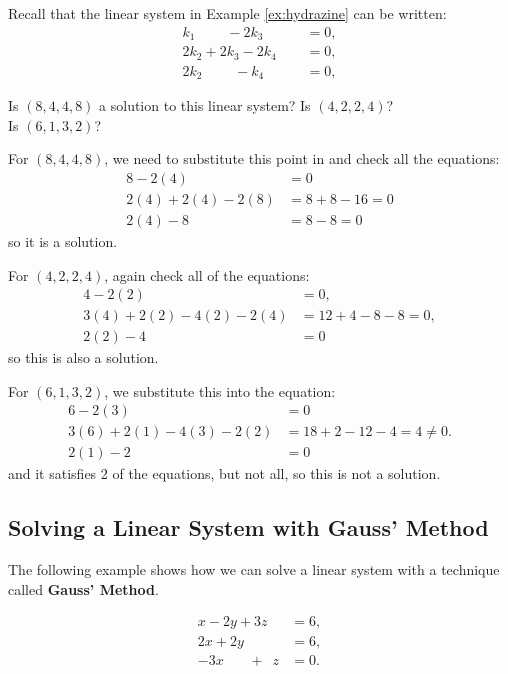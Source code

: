 \begin{example}
Recall that the linear system in Example \ref{ex:hydrazine} can be written:
\begin{align*}
k_1 \phantom{+2k_2}- 2k_3\phantom{+2k_4} & = 0, \\
2k_2 + 2k_3 -2k_4 & = 0, \\
2k_2 \phantom{+2x_3}- k_4 & = 0,
\end{align*}

Is $(8,4,4,8)$ a solution to this linear system?  Is $(4,2,2,4)$? \\  Is $(6,1,3,2)$?

\solution

For $(8,4,4,8)$, we need to substitute this point in and check all the equations:
%
\begin{align*}
8-2(4) & = 0 \\
2(4)+2(4)-2(8) & = 8+8-16 = 0 \\
2(4)-8 & = 8-8 = 0  
\end{align*}
so it is a solution. 

For $(4,2,2,4)$, again check all of the equations:
%
\begin{align*}
4-2(2) & = 0, \\
3(4)+2(2)-4(2)-2(4) & = 12+4-8-8=0, \\
2(2)-4& = 0
\end{align*}
so this is also a solution.  


For $(6,1,3,2)$, we substitute this into the equation:
%
\begin{align*}
6-2(3) & = 0 \\
3(6)+2(1)-4(3)-2(2) & = 18+2-12-4 = 4 \neq 0. \\
2(1) - 2 & = 0 
\end{align*}
and it satisfies 2 of the equations, but not all, so this is not a solution.  

\end{example}


\subsection{Solving a Linear System with Gauss' Method} 

The following example shows how we can solve a linear system with a technique called \textbf{Gauss' Method}.  

\begin{align*}
x -2y + 3z  &= 6, \\
2x + 2 y\phantom{+2z} &= 6, \\
-3x \phantom{+2y}+\phantom{3} z  &= 0.
\end{align*}

